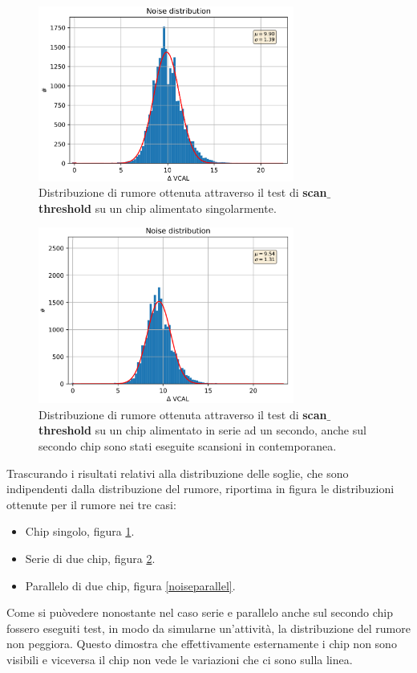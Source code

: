 \begin{figure}[h]
\centering
\includegraphics[width=0.75\textwidth]{Immagini/NoiseSingle}
\caption{Distribuzione di rumore ottenuta attraverso il test di \textbf{scan$\_$threshold} su un chip alimentato singolarmente.}
\label{noisesingle}
\end{figure}
\begin{figure}
\centering
\includegraphics[width=0.75\textwidth]{Immagini/NoiseSerial}
\caption{Distribuzione di rumore ottenuta attraverso il test di \textbf{scan$\_$threshold} su un chip alimentato in serie ad un secondo, anche sul secondo chip sono stati eseguite scansioni in contemporanea.}
\label{noiseserial}
\end{figure}

Trascurando i risultati relativi alla distribuzione delle soglie, che sono indipendenti dalla distribuzione del rumore, riportima in figura le distribuzioni ottenute per il rumore nei tre casi:
\begin{itemize}
\item Chip singolo, figura \ref{noisesingle}.
\item Serie di due chip, figura \ref{noiseserial}.
\item Parallelo di due chip, figura \ref{noiseparallel}.
\end{itemize}
Come si puòvedere nonostante nel caso serie e parallelo anche sul secondo chip fossero eseguiti test, in modo da simularne un'attività, la distribuzione del rumore non peggiora. 
Questo dimostra che effettivamente esternamente i chip non sono visibili e viceversa il chip non vede le variazioni che ci sono sulla linea.


